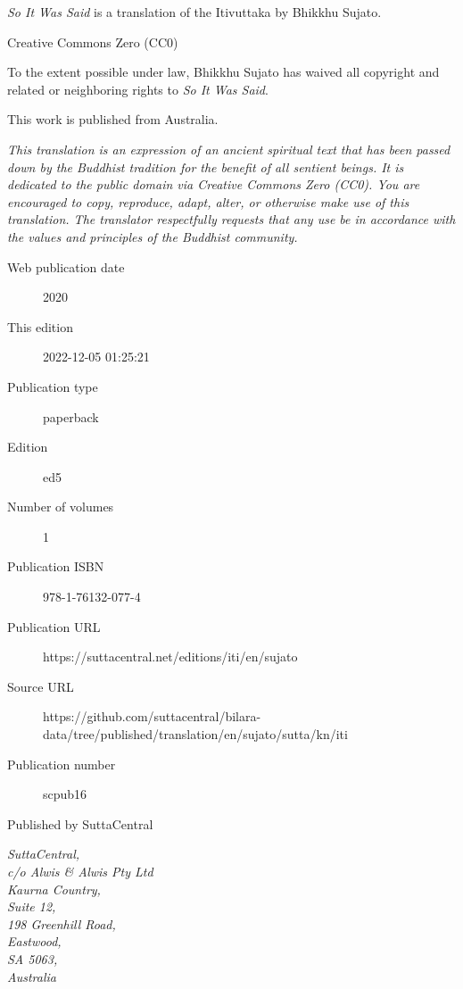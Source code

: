 \documentclass[12pt,openany]{book}%
\begin{document}
\begin{footnotesize}

\textit{So It Was Said} is a translation of the Itivuttaka by Bhikkhu Sujato.

\medskip

Creative Commons Zero (CC0)

To the extent possible under law, Bhikkhu Sujato has waived all copyright and related or neighboring rights to \textit{So It Was Said}.

\medskip

This work is published from Australia.

\begin{center}
\textit{This translation is an expression of an ancient spiritual text that has been passed down by the Buddhist tradition for the benefit of all sentient beings. It is dedicated to the public domain via Creative Commons Zero (CC0). You are encouraged to copy, reproduce, adapt, alter, or otherwise make use of this translation. The translator respectfully requests that any use be in accordance with the values and principles of the Buddhist community.}
\end{center}

\medskip

\begin{description}
    \item[Web publication date] 2020
    \item[This edition] 2022-12-05 01:25:21
    \item[Publication type] paperback
    \item[Edition] ed5
    \item[Number of volumes] 1
    \item[Publication ISBN] 978-1-76132-077-4
    \item[Publication URL] https://suttacentral.net/editions/iti/en/sujato
    \item[Source URL] https://github.com/suttacentral/bilara-data/tree/published/translation/en/sujato/sutta/kn/iti
    \item[Publication number] scpub16
\end{description}

\medskip

Published by SuttaCentral

\medskip

\textit{SuttaCentral,\\
c/o Alwis \& Alwis Pty Ltd\\
Kaurna Country,\\
Suite 12,\\
198 Greenhill Road,\\
Eastwood,\\
SA 5063,\\
Australia}

\end{footnotesize}
\end{document}
